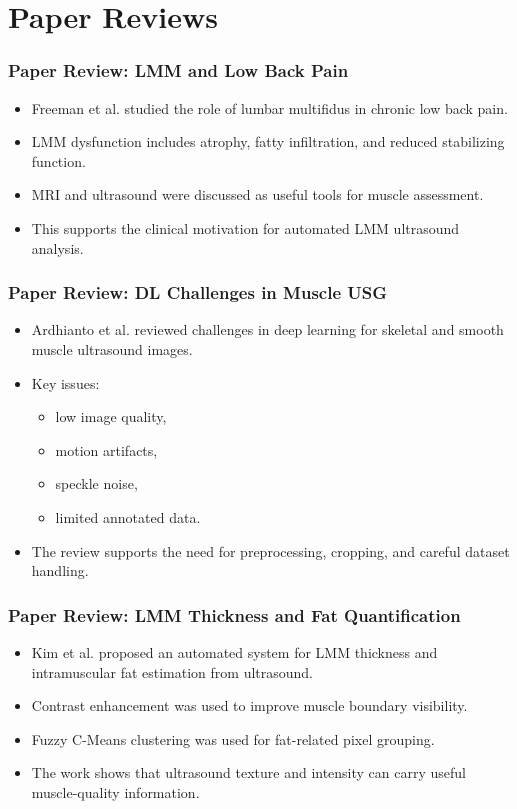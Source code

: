 \documentclass{beamer}
\begin{document}
\section{Paper Reviews}

\begin{frame}
\frametitle{Paper Review: LMM and Low Back Pain}
\begin{itemize}
\item Freeman et al. studied the role of lumbar multifidus in chronic low back pain.
\item LMM dysfunction includes atrophy, fatty infiltration, and reduced stabilizing function.
\item MRI and ultrasound were discussed as useful tools for muscle assessment.
\item This supports the clinical motivation for automated LMM ultrasound analysis.
\end{itemize}
\end{frame}

\begin{frame}
\frametitle{Paper Review: DL Challenges in Muscle USG}
\begin{itemize}
\item Ardhianto et al. reviewed challenges in deep learning for skeletal and smooth muscle ultrasound images.
\item Key issues:
\begin{itemize}
    \item low image quality,
    \item motion artifacts,
    \item speckle noise,
    \item limited annotated data.
\end{itemize}
\item The review supports the need for preprocessing, cropping, and careful dataset handling.
\end{itemize}
\end{frame}

\begin{frame}
\frametitle{Paper Review: LMM Thickness and Fat Quantification}
\begin{itemize}
\item Kim et al. proposed an automated system for LMM thickness and intramuscular fat estimation from ultrasound.
\item Contrast enhancement was used to improve muscle boundary visibility.
\item Fuzzy C-Means clustering was used for fat-related pixel grouping.
\item The work shows that ultrasound texture and intensity can carry useful muscle-quality information.
\end{itemize}
\end{frame}
\end{document}
